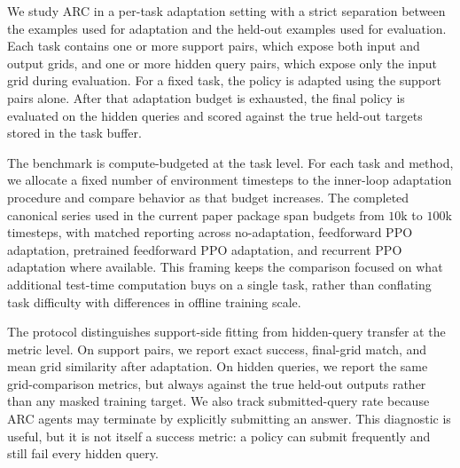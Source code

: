 %
%

We study ARC in a per-task adaptation setting with a strict separation between the examples used for adaptation and the held-out examples used for evaluation. Each task contains one or more support pairs, which expose both input and output grids, and one or more hidden query pairs, which expose only the input grid during evaluation. For a fixed task, the policy is adapted using the support pairs alone. After that adaptation budget is exhausted, the final policy is evaluated on the hidden queries and scored against the true held-out targets stored in the task buffer.

The benchmark is compute-budgeted at the task level. For each task and method, we allocate a fixed number of environment timesteps to the inner-loop adaptation procedure and compare behavior as that budget increases. The completed canonical series used in the current paper package span budgets from $10$k to $100$k timesteps, with matched reporting across no-adaptation, feedforward PPO adaptation, pretrained feedforward PPO adaptation, and recurrent PPO adaptation where available. This framing keeps the comparison focused on what additional test-time computation buys on a single task, rather than conflating task difficulty with differences in offline training scale.

The protocol distinguishes support-side fitting from hidden-query transfer at the metric level. On support pairs, we report exact success, final-grid match, and mean grid similarity after adaptation. On hidden queries, we report the same grid-comparison metrics, but always against the true held-out outputs rather than any masked training target. We also track submitted-query rate because ARC agents may terminate by explicitly submitting an answer. This diagnostic is useful, but it is not itself a success metric: a policy can submit frequently and still fail every hidden query.

